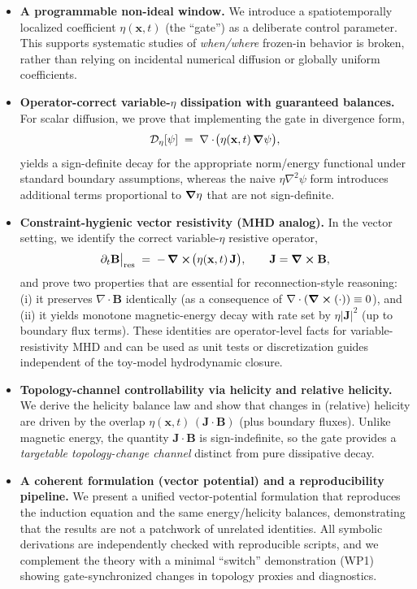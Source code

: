 \documentclass[11pt]{article}
\theoremstyle{plain}
\theoremstyle{definition}
\theoremstyle{remark}
\newcommand{\diver}{\nabla\cdot}
\newcommand{\B}{\mathbf{B}}
\newcommand{\J}{\mathbf{J}}
\begin{document}
\begin{itemize}[leftmargin=*]
  \item \textbf{A programmable non-ideal window.}
  We introduce a spatiotemporally localized coefficient $\eta(\mathbf{x},t)$ (the ``gate'') as a deliberate control parameter. This supports systematic studies of \emph{when/where} frozen-in behavior is broken, rather than relying on incidental numerical diffusion or globally uniform coefficients.

  \item \textbf{Operator-correct variable-$\eta$ dissipation with guaranteed balances.}
  For scalar diffusion, we prove that implementing the gate in divergence form,
  \begin{equation}
    \mathcal{D}_\eta[\psi] \;=\; \diver\!\big(\eta(\mathbf{x},t)\,\grad \psi\big),
  \end{equation}
  yields a sign-definite decay for the appropriate norm/energy functional under standard boundary assumptions, whereas the naive $\eta\nabla^2\psi$ form introduces additional terms proportional to $\grad\eta$ that are not sign-definite.

  \item \textbf{Constraint-hygienic vector resistivity (MHD analog).}
  In the vector setting, we identify the correct variable-$\eta$ resistive operator,
  \begin{equation}
    \partial_t \B\big|_{\mathrm{res}} \;=\; -\,\curl\!\big(\eta(\mathbf{x},t)\,\J\big),
    \qquad \J=\curl\B,
  \end{equation}
  and prove two properties that are essential for reconnection-style reasoning:
  (i) it preserves $\diver\B$ identically (as a consequence of $\diver(\curl(\cdot))\equiv 0$), and
  (ii) it yields monotone magnetic-energy decay with rate set by $\eta|\J|^2$ (up to boundary flux terms).
  These identities are operator-level facts for variable-resistivity MHD and can be used as unit tests or discretization guides independent of the toy-model hydrodynamic closure.

  \item \textbf{Topology-channel controllability via helicity and relative helicity.}
  We derive the helicity balance law and show that changes in (relative) helicity are driven by the overlap
  $\eta(\mathbf{x},t)\,(\J\cdot\B)$ (plus boundary fluxes). Unlike magnetic energy, the quantity $\J\cdot\B$ is sign-indefinite, so the gate provides a \emph{targetable topology-change channel} distinct from pure dissipative decay.

  \item \textbf{A coherent formulation (vector potential) and a reproducibility pipeline.}
  We present a unified vector-potential formulation that reproduces the induction equation and the same energy/helicity balances, demonstrating that the results are not a patchwork of unrelated identities. All symbolic derivations are independently checked with reproducible scripts, and we complement the theory with a minimal ``switch'' demonstration (WP1) showing gate-synchronized changes in topology proxies and diagnostics.
\end{itemize}
\end{document}
